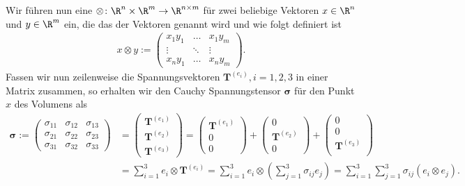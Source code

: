 \documentclass[letterpaper,10pt,german]{jupyterBook}
\begin{document}
\sphinxAtStartPar
Wir führen nun eine  \(\otimes \colon \R^n \times \R^m \rightarrow \R^{n \times m}\) für zwei beliebige Vektoren \(x\in\R^n\) und \(y\in\R^m\) ein, die das  der Vektoren genannt wird und wie folgt definiert ist
\begin{equation*}
\begin{split}x \otimes y := 
\begin{pmatrix}
x_1y_1 &\ldots &x_1 y_m\\
\vdots &\ddots & \vdots\\
x_n y_1&\ldots& x_n y_m
\end{pmatrix}.\end{split}
\end{equation*}
\sphinxAtStartPar
Fassen wir nun zeilenweise die Spannungsvektoren \(\mathbf{T}^{(e_i)}, i=1,2,3\) in einer Matrix zusammen, so erhalten wir den Cauchy Spannungstensor \(\mathbf{\sigma}\) für den Punkt \(x\) des Volumens als
\begin{equation}\label{equation:vektoranalysis/tensor:eq:cauchySpannungstensor}
\begin{split}\mathbf{\sigma} := 
\begin{pmatrix}
\sigma_{11} & \sigma_{12} & \sigma_{13} \\
\sigma_{21} & \sigma_{22} & \sigma_{23} \\
\sigma_{31} & \sigma_{32} & \sigma_{33}
\end{pmatrix} 
&= 
\begin{pmatrix}
\mathbf{T}^{(e_1)} \\
\mathbf{T}^{(e_2)} \\
\mathbf{T}^{(e_3)}
\end{pmatrix}
= 
\begin{pmatrix}
\mathbf{T}^{(e_1)} \\
0 \\
0
\end{pmatrix}
+
\begin{pmatrix}
0 \\
\mathbf{T}^{(e_2)} \\
0
\end{pmatrix}
+
\begin{pmatrix}
0 \\
0 \\
\mathbf{T}^{(e_3)} \\
\end{pmatrix}\\
&=
\sum_{i=1}^3 e_i \otimes \mathbf{T}^{(e_i)} = \sum_{i=1}^3 e_i\otimes ( \sum_{j=1}^3 \sigma_{ij} e_j) =
\sum_{i=1}^3\sum_{j=1}^3 \sigma_{ij} (e_i\otimes e_j).\end{split}
\end{equation}
\end{document}
